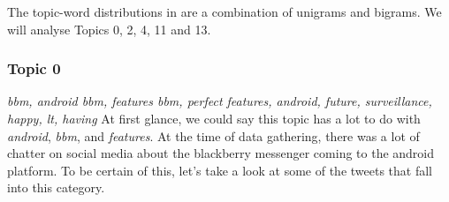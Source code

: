 
The topic-word distributions in  are a combination of unigrams
and bigrams. We will analyse Topics 0, 2, 4, 11 and 13.


\subsubsection{Topic 0}
\label{sec:topic_0}
\textit{bbm, android bbm, features bbm, perfect features, android, future, surveillance, happy, lt,
having}
At first glance, we could say this topic has a lot to do with \textit{android}, \textit{bbm}, and
\textit{features}. At the time of data gathering, there was a lot of chatter on social media about
the blackberry messenger coming to the android platform. To be certain of this, let's take a look at
some of the tweets that fall into this category.

